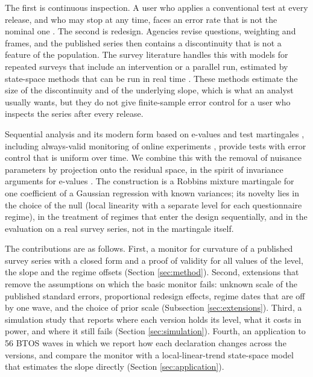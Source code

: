 \documentclass[Afour,sageh,times]{sagej}
\theoremstyle{definition}
\begin{document}
The first is continuous inspection. A user who applies a conventional test at every release, and who may stop at any time, faces an error rate that is not the nominal one \citep{armitage1969}. The second is redesign. Agencies revise questions, weighting and frames, and the published series then contains a discontinuity that is not a feature of the population. The survey literature handles this with models for repeated surveys that include an intervention or a parallel run, estimated by state-space methods that can be run in real time \citep{scott1974,vandenbrakel2010,ohara2019,durbin2012}. These methods estimate the size of the discontinuity and of the underlying slope, which is what an analyst usually wants, but they do not give finite-sample error control for a user who inspects the series after every release.

Sequential analysis \citep{wald1945,page1954,brown1975,lan1983,chu1996} and its modern form based on e-values and test martingales \citep{howard2021,vovk2021,ramdas2023,grunwald2024,shin2023}, including always-valid monitoring of online experiments \citep{johari2022}, provide tests with error control that is uniform over time. We combine this with the removal of nuisance parameters by projection onto the residual space, in the spirit of invariance arguments for e-values \citep{perezortiz2024}. The construction is a Robbins mixture martingale for one coefficient of a Gaussian regression with known variances; its novelty lies in the choice of the null (local linearity with a separate level for each questionnaire regime), in the treatment of regimes that enter the design sequentially, and in the evaluation on a real survey series, not in the martingale itself.

The contributions are as follows. First, a monitor for curvature of a published survey series with a closed form and a proof of validity for all values of the level, the slope and the regime offsets (Section \ref{sec:method}). Second, extensions that remove the assumptions on which the basic monitor fails: unknown scale of the published standard errors, proportional redesign effects, regime dates that are off by one wave, and the choice of prior scale (Subsection \ref{sec:extensions}). Third, a simulation study that reports where each version holds its level, what it costs in power, and where it still fails (Section \ref{sec:simulation}). Fourth, an application to 56 BTOS waves in which we report how each declaration changes across the versions, and compare the monitor with a local-linear-trend state-space model that estimates the slope directly (Section \ref{sec:application}).
\end{document}
